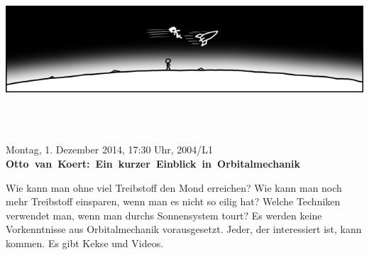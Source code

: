 \documentclass[a4paper,ngerman,landscape]{scrartcl}
\begin{document}
\begin{center}
  \Huge
  \vspace*{0.0em}
  \includegraphics[scale=1.00]{orbit-wide}
  \vspace{0.5em}

  \\[0.6em]
  \\[0.6em]
  \vspace{1em}

  Montag, 1. Dezember 2014, 17:30 Uhr, 2004/L1 \\
  \mbox{\textbf{Otto van Koert: Ein kurzer Einblick in Orbitalmechanik}}

  \Large
  \begin{minipage}{0.80\textwidth}
    \setlength\parskip{\medskipamount}
    \vspace{0.3em}
    Wie kann man ohne viel Treibstoff den Mond erreichen? Wie kann man noch
    mehr Treibstoff einsparen, wenn man es nicht so eilig hat? Welche Techniken
    verwendet man, wenn man durchs Sonnensystem tourt?
    Es werden keine Vorkenntnisse aus Orbitalmechanik vorausgesetzt. Jeder, der
    interessiert ist, kann kommen. Es gibt Kekse und Videos.
  \end{minipage}
\end{center}
\end{document}
